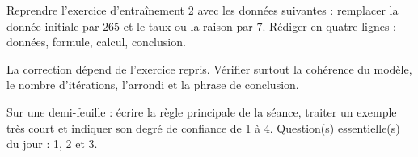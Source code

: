 
\begin{homework}Reprendre l'exercice d'entraînement 2 avec les données suivantes : remplacer la donnée initiale par $265$ et le taux ou la raison par $7$. Rédiger en quatre lignes : données, formule, calcul, conclusion.\end{homework}
\begin{solution}La correction dépend de l'exercice repris. Vérifier surtout la cohérence du modèle, le nombre d'itérations, l'arrondi et la phrase de conclusion.\end{solution}

\begin{exitticket}[3 minutes]Sur une demi-feuille : écrire la règle principale de la séance, traiter un exemple très court et indiquer son degré de confiance de 1 à 4. Question(s) essentielle(s) du jour : 1, 2 et 3.\end{exitticket}


